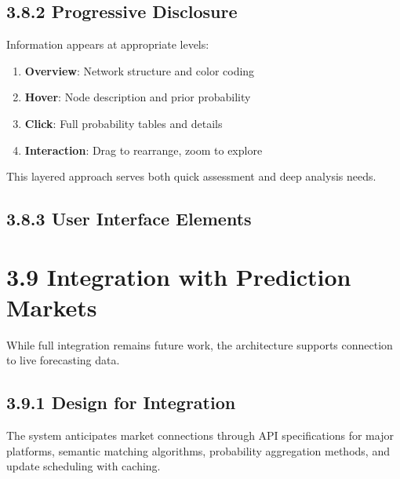 \documentclass[
  11pt,
  letterpaper,
]{book}
\providecommand{\tightlist}{%
  \setlength{\itemsep}{0pt}\setlength{\parskip}{0pt}}
\begin{document}
\subsection*{3.8.2 Progressive
Disclosure}\label{sec-progressive-disclosure}

Information appears at appropriate levels:

\begin{enumerate}
\def\labelenumi{\arabic{enumi}.}
\tightlist
\item
  \textbf{Overview}: Network structure and color coding
\item
  \textbf{Hover}: Node description and prior probability
\item
  \textbf{Click}: Full probability tables and details
\item
  \textbf{Interaction}: Drag to rearrange, zoom to explore
\end{enumerate}

This layered approach serves both quick assessment and deep analysis
needs.

\subsection*{3.8.3 User Interface Elements}\label{sec-ui-elements}

\section*{3.9 Integration with Prediction
Markets}\label{sec-market-integration}


While full integration remains future work, the architecture supports
connection to live forecasting data.

\subsection*{3.9.1 Design for Integration}\label{sec-integration-design}

\begin{tcolorbox}[enhanced jigsaw, arc=.35mm, titlerule=0mm, breakable, toprule=.15mm, toptitle=1mm, colframe=quarto-callout-note-color-frame, coltitle=black, bottomrule=.15mm, bottomtitle=1mm, opacityback=0, title=\textcolor{quarto-callout-note-color}{\faInfo}\hspace{0.5em}{Integration Architecture}, rightrule=.15mm, leftrule=.75mm, colback=white, colbacktitle=quarto-callout-note-color!10!white, opacitybacktitle=0.6, left=2mm]

The system anticipates market connections through API specifications for
major platforms, semantic matching algorithms, probability aggregation
methods, and update scheduling with caching.

\end{tcolorbox}
\end{document}
